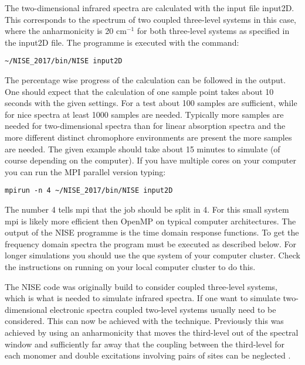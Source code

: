 The two-dimensional infrared spectra are calculated with the input file input2D. This corresponds to the spectrum of two coupled three-level systems in this case, where the anharmonicity is 20 cm$^{-1}$ for both three-level systems as specified in the input2D file. The programme is executed with the command:
\begin{lstlisting}[style=mystyle]
~/NISE_2017/bin/NISE input2D
\end{lstlisting}
The percentage wise progress of the calculation can be followed in the output. One should expect that the calculation of one sample point takes about 10 seconds with the given settings. For a test about 100 samples are sufficient, while for nice spectra at least 1000 samples are needed. Typically more samples are needed for two-dimensional spectra than for linear absorption spectra and the more different distinct chromophore environments are present the more samples are needed. The given example should take about 15 minutes to simulate (of course depending on the computer).
If you have multiple cores on your computer you can run the MPI parallel version typing:
\begin{lstlisting}[style=mystyle]
mpirun -n 4 ~/NISE_2017/bin/NISE input2D
\end{lstlisting}
The number 4 tells mpi that the job should be split in 4. For this small system mpi is likely more efficient then OpenMP on typical computer architectures. The output of the NISE programme is the time domain response functions. To get the frequency domain spectra the  program must be executed as described below. For longer simulations you should use the que system of your computer cluster. Check the instructions on running on your local computer cluster to do this.

The NISE code was originally build to consider coupled three-level systems, which is what is needed to simulate infrared spectra. If one want to simulate two-dimensional electronic spectra coupled two-level systems usually need to be considered. This can now be achieved with the  technique. Previously this was achieved by using an anharmonicity that moves the third-level out of the spectral window and sufficiently far away that the coupling between the third-level for each monomer and double excitations involving pairs of sites can be neglected \cite{Olbrich.2011.JPCB.115.8609,Liang.2012.JCTC.8.1706}. 

